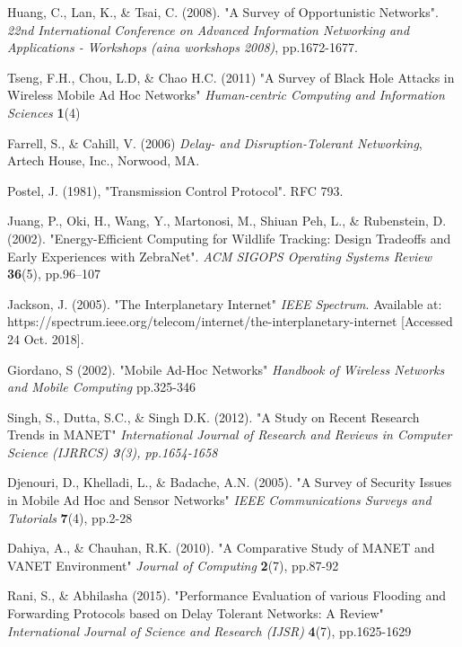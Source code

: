 \documentclass{article}
\begin{document}
\begin{thebibliography}{20}

Huang, C., Lan, K., \& Tsai, C. (2008). 
"A Survey of Opportunistic Networks". 
\textit{22nd International Conference on Advanced Information Networking and Applications - Workshops (aina workshops 2008)}, pp.1672-1677.

Tseng, F.H., Chou, L.D, \& Chao H.C. (2011)
"A Survey of Black Hole Attacks in Wireless Mobile Ad Hoc Networks"
\textit{Human-centric Computing and Information Sciences} \textbf{1}(4)

Farrell, S., \& Cahill, V. (2006) \textit{Delay- and Disruption-Tolerant Networking}, Artech House, Inc., Norwood, MA.

Postel, J. (1981), "Transmission Control Protocol". RFC 793.

Juang, P., Oki, H., Wang, Y., Martonosi, M., Shiuan Peh, L., \& Rubenstein, D. (2002).
"Energy-Efficient Computing for Wildlife Tracking: Design Tradeoffs and Early Experiences with ZebraNet".
\textit{ACM SIGOPS Operating Systems Review} \textbf{36}(5), pp.96–107

Jackson, J. (2005). 
"The Interplanetary Internet"
\textit{IEEE Spectrum}. Available at: https://spectrum.ieee.org/telecom/internet/the-interplanetary-internet [Accessed 24 Oct. 2018].

Giordano, S (2002).
"Mobile Ad-Hoc Networks"
\textit{Handbook of Wireless Networks and Mobile Computing} pp.325-346

Singh, S., Dutta, S.C., \& Singh D.K. (2012). 
"A Study on Recent Research Trends in MANET"
\textit{International Journal of Research and Reviews in Computer Science (IJRRCS) \textbf{3}(3), pp.1654-1658} 

Djenouri, D., Khelladi, L., \& Badache, A.N. (2005).
"A Survey of Security Issues in Mobile Ad Hoc and Sensor Networks"
\textit{IEEE Communications Surveys and Tutorials} \textbf{7}(4), pp.2-28

Dahiya, A., \& Chauhan, R.K. (2010).
"A Comparative Study of MANET and VANET Environment"
\textit{Journal of Computing} \textbf{2}(7), pp.87-92

Rani, S., \& Abhilasha (2015).
"Performance Evaluation of various Flooding and
Forwarding Protocols based on Delay Tolerant
Networks: A Review"
\textit{International Journal of Science and Research (IJSR)} \textbf{4}(7), pp.1625-1629


\end{thebibliography}
\end{document}
